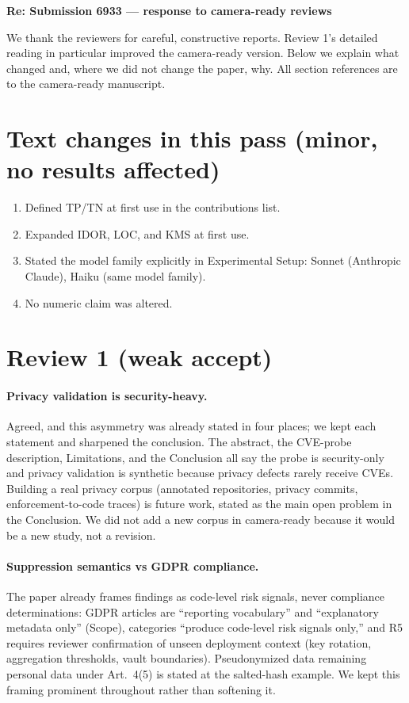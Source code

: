 \documentclass[11pt,a4paper]{article}
\begin{document}
\begin{center}
{\Large\bfseries Re: Submission 6933 --- response to camera-ready reviews}
\end{center}

We thank the reviewers for careful, constructive reports. Review 1's detailed reading in particular improved the camera-ready version. Below we explain what changed and, where we did not change the paper, why. All section references are to the camera-ready manuscript.

\section*{Text changes in this pass (minor, no results affected)}
\begin{enumerate}
\item Defined TP/TN at first use in the contributions list.
\item Expanded IDOR, LOC, and KMS at first use.
\item Stated the model family explicitly in Experimental Setup: Sonnet (Anthropic Claude), Haiku (same model family).
\item No numeric claim was altered.
\end{enumerate}

\section*{Review 1 (weak accept)}

\paragraph{Privacy validation is security-heavy.} Agreed, and this asymmetry was already stated in four places; we kept each statement and sharpened the conclusion. The abstract, the CVE-probe description, Limitations, and the Conclusion all say the probe is security-only and privacy validation is synthetic because privacy defects rarely receive CVEs. Building a real privacy corpus (annotated repositories, privacy commits, enforcement-to-code traces) is future work, stated as the main open problem in the Conclusion. We did not add a new corpus in camera-ready because it would be a new study, not a revision.

\paragraph{Suppression semantics vs GDPR compliance.} The paper already frames findings as code-level risk signals, never compliance determinations: GDPR articles are ``reporting vocabulary'' and ``explanatory metadata only'' (Scope), categories ``produce code-level risk signals only,'' and R5 requires reviewer confirmation of unseen deployment context (key rotation, aggregation thresholds, vault boundaries). Pseudonymized data remaining personal data under Art.\ 4(5) is stated at the salted-hash example. We kept this framing prominent throughout rather than softening it.
\end{document}
